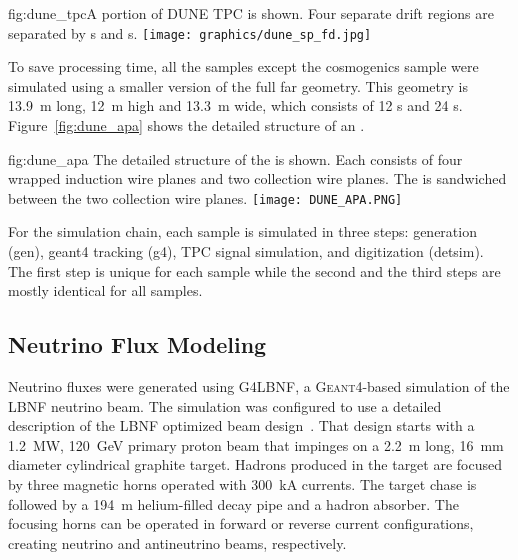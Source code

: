 \begin{dunefigure}{fig:dune_tpc}{A portion of DUNE \single TPC is shown. Four separate drift regions are separated by s and s.}
\texttt{[image: graphics/dune\_sp\_fd.jpg]}
\end{dunefigure}

To save processing time, all the  samples except the cosmogenics sample were simulated using a smaller version of the full \nominalmodsize far  geometry. This geometry is \SI{13.9}{m} long, \SI{12}{m} high and \SI{13.3}{m} wide, which consists of 12 s and 24 s. %
Figure~\ref{fig:dune_apa} shows the detailed structure of an . %
\begin{dunefigure}
{fig:dune_apa}
{The detailed structure of the  is shown. Each  consists of four wrapped induction wire planes and two collection wire planes.
The  is sandwiched between the two collection wire planes.}
\texttt{[image: DUNE\_APA.PNG]}
\end{dunefigure}


For the simulation chain, each sample is simulated in three steps: generation (gen), {\sc geant4} tracking (g4), TPC signal simulation, and digitization (detsim). The first step is unique for each sample while the second and the third steps are mostly identical for all samples. 

\subsection{Neutrino Flux Modeling}
\label{sec:tools-mc-flux}

Neutrino fluxes were generated using G4LBNF, a \textsc{Geant}4\xspace-based simulation of the LBNF neutrino beam.  The simulation was configured to use a detailed description of the LBNF optimized beam design~\cite{optimizedbeamcdr}.  That design starts with a \SI{1.2}{MW}, \SI{120}{\GeV} primary proton beam that impinges on a \SI{2.2}{m} long, \SI{16}{mm} diameter cylindrical graphite target.  Hadrons produced in the target are focused by three magnetic horns operated with \SI{300}{kA} currents.  The target chase is followed by a \SI{194}{m} helium-filled decay pipe and a hadron absorber.  The focusing horns can be operated in forward or reverse current configurations, creating neutrino and antineutrino beams, respectively.   

